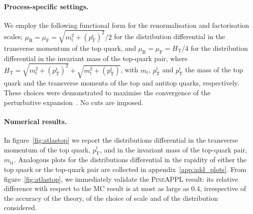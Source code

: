 \paragraph{Process-specific settings.}
We employ the following functional form for the renormalisation and factorisation scales;
$\mu_\mathrm{R}=\mu_\mathrm{F}=\sqrt{m_\mathrm{t}^2+(p_\mathrm{T}^\mathrm{t})^2}{\Big /}2$ for the distribution differential
in the transverse momentum of the top quark, and $\mu_\mathrm{R}=\mu_\mathrm{F}=H_\mathrm{T}/4$ for the
distribution differential in the invariant mass of the top-quark pair, where
$H_\mathrm{T}=\sqrt{m_\mathrm{t}^2+(p_\mathrm{T}^\mathrm{t})^2}+\sqrt{m_\mathrm{t}^2+(p_\mathrm{T}^{\bar{\mathrm{t}}})}$, with $m_\mathrm{t}$,
$p_\mathrm{T}^\mathrm{t}$ and $p_\mathrm{T}^{\bar{\mathrm{t}}}$ the mass of the top quark and the transverse momenta
of the top and antitop quarks, respectively. These choices were demonstrated
to maximise the convergence of the perturbative expansion~\cite{Czakon:2016dgf}. No cuts are imposed.

\paragraph{Numerical results.}

In figure~\ref{fig:atlastop} we report the
distributions differential in the transverse momentum of the top quark,
$p_\mathrm{T}^\mathrm{t}$, and in the invariant mass of the top-quark pair,
$m_{\mathrm{t}\bar{\mathrm{t}}}$. Analogous plots for the distributions differential
in the rapidity of either the top quark or the top-quark pair are collected in
appendix~\ref{app:add_plots}. From figure~\ref{fig:atlastop}, we immediately
validate the \textsc{PineAPPL} result: its relative difference with respect to
the MC result is at most as large as \SI{0.4}{\permille}, irrespective of the
accuracy of the theory, of the choice of scale and of the distribution
considered.


